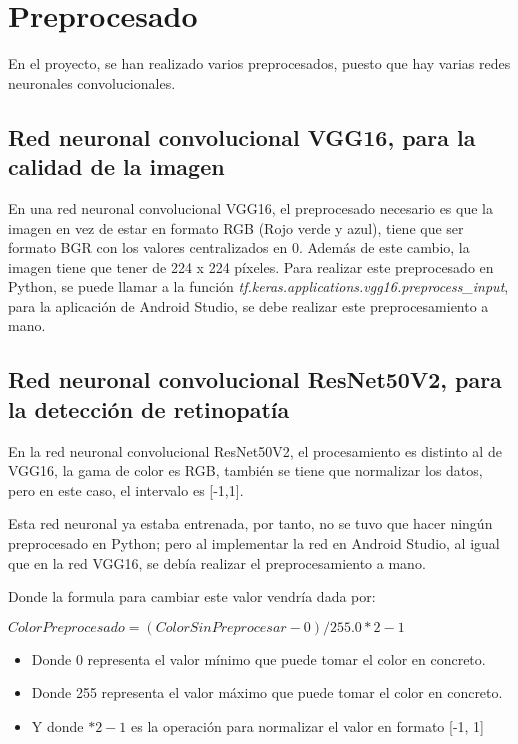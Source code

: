 \section{Preprocesado}
En el proyecto, se han realizado varios preprocesados, puesto que hay varias redes neuronales convolucionales.

\subsection{Red neuronal convolucional VGG16, para la calidad de la imagen}

En una red neuronal convolucional VGG16, el preprocesado necesario es que la imagen en vez de estar en formato RGB (Rojo verde y azul), tiene que ser formato BGR con los valores centralizados en 0. Además de este cambio, la imagen tiene que tener de 224 x 224 píxeles.
\cite{tensorflowVGG16}
Para realizar este preprocesado en Python, se puede llamar a la función \textit{tf.keras.applications.vgg16.preprocess\_input}, para la aplicación de Android Studio, se debe realizar este preprocesamiento a mano.


\subsection{Red neuronal convolucional ResNet50V2, para la detección de retinopatía}

En la red neuronal convolucional ResNet50V2, el procesamiento es distinto al de VGG16, la gama de color es RGB, también se tiene que normalizar los datos, pero en este caso, el intervalo es [-1,1]. \cite{tensorflowResNet50V2}

Esta red neuronal ya estaba entrenada, por tanto, no se tuvo que hacer ningún preprocesado en Python; pero al implementar la red en Android Studio, al igual que en la red VGG16, se debía realizar el preprocesamiento a mano.

Donde la formula para cambiar este valor vendría dada por: 
\begin{center}
    $ColorPreprocesado = (ColorSinPreprocesar - 0)/ 255.0 * 2 - 1$
    \begin{itemize}
        \item Donde 0 representa el valor mínimo que puede tomar el color en concreto.
        \item Donde 255 representa el valor máximo que puede tomar el color en concreto.
        \item Y donde $ * 2 - 1 $ es la operación para normalizar el valor en formato [-1, 1]
    \end{itemize}
\end{center}


